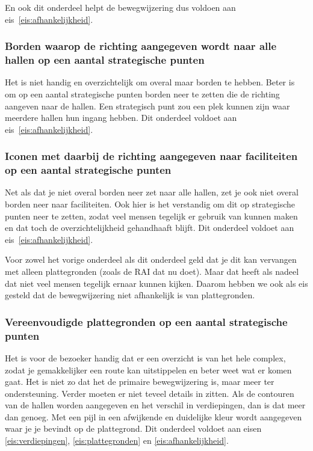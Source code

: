 En ook dit onderdeel helpt de bewegwijzering dus voldoen aan eis~\ref{eis:afhankelijkheid}.


\subsubsection{Borden waarop de richting aangegeven wordt naar alle hallen op een aantal strategische punten}

Het is niet handig en overzichtelijk om overal maar borden te hebben. Beter is om op een aantal strategische punten borden neer te zetten die de richting aangeven naar de hallen. Een strategisch punt zou een plek kunnen zijn waar meerdere hallen hun ingang hebben. Dit onderdeel voldoet aan eis~\ref{eis:afhankelijkheid}.


\subsubsection{Iconen met daarbij de richting aangegeven naar faciliteiten op een aantal strategische punten}

Net als dat je niet overal borden neer zet naar alle hallen, zet je ook niet overal borden neer naar faciliteiten. Ook hier is het verstandig om dit op strategische punten neer te zetten, zodat veel mensen tegelijk er gebruik van kunnen maken en dat toch de overzichtelijkheid gehandhaaft blijft. Dit onderdeel voldoet aan eis~\ref{eis:afhankelijkheid}.

Voor zowel het vorige onderdeel als dit onderdeel geld dat je dit kan vervangen met alleen plattegronden (zoals de RAI dat nu doet). Maar dat heeft als nadeel dat niet veel mensen tegelijk ernaar kunnen kijken. Daarom hebben we ook als eis gesteld dat de bewegwijzering niet afhankelijk is van plattegronden.


\subsubsection{Vereenvoudigde plattegronden op een aantal strategische punten}

Het is voor de bezoeker handig dat er een overzicht is van het hele complex, zodat je gemakkelijker een route kan uitstippelen en beter weet wat er komen gaat. Het is niet zo dat het de primaire bewegwijzering is, maar meer ter ondersteuning. Verder moeten er niet teveel details in zitten. Als de contouren van de hallen worden aangegeven en het verschil in verdiepingen, dan is dat meer dan genoeg. Met een pijl in een afwijkende en duidelijke kleur wordt aangegeven waar je je bevindt op de plattegrond. Dit onderdeel voldoet aan eisen \ref{eis:verdiepingen}, \ref{eis:plattegronden} en \ref{eis:afhankelijkheid}.


